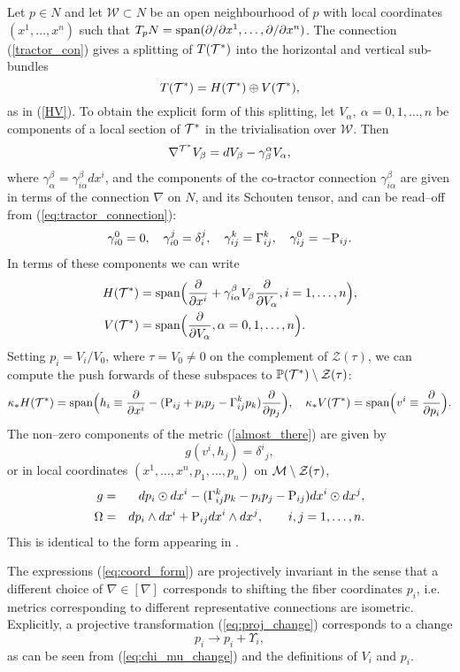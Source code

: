 Let $p\in N$ and let ${\mathcal W}\subset N$ be an open 
neighbourhood of $p$ with 
local coordinates $(x^1, \dots, x^n)$ such that
$T_pN=\mbox{span}(\partial/\partial x^1, \dots, \partial/\partial x^n)$. The connection 
(\ref{tractor_con}) gives a splitting of $T(\mathcal{T}^*)$ into the horizontal and
vertical sub-bundles
\[
T(\mathcal{T}^*)=H(\mathcal{T}^*)\oplus V(\mathcal{T}^*),
\]
as in (\ref{HV}).
To obtain the explicit form of this splitting, let $V_\alpha,\ \alpha=0, 1, \dots, n$ be components of a local section of $\mathcal{T}^*$ in the trivialisation over ${\mathcal{W}}$.
Then
\[
\nabla^{\mathcal{T}^*} V_\beta=d V_\beta-\gamma_{\beta}^{\alpha} V_\alpha,
\]
where $\gamma_{\alpha}^\beta= \gamma_{i\alpha}^\beta dx^i$, and the components
of the co-tractor connection 
$\gamma_{i\alpha}^\beta$  are given in terms of the connection
$\nabla$ on $N$, and its Schouten tensor, and 
can be read--off from (\ref{eq:tractor_connection}):
\[
\gamma_{i0}^0=0, \quad \gamma_{i0}^j=\delta_i^j,\quad
\gamma_{ij}^k=\Gamma_{ij}^k, \quad \gamma_{ij}^0=-\mathrm{P}_{ij}.
\]
In terms of these components we can write
\begin{align*}
H(\mathcal{T}^*)&=\mbox{span}
\Big( \frac{\partial}{\partial x^i}+ {\gamma_{i\alpha}^\beta} V_\beta
\frac{\partial}{\partial V_{\alpha}}, i=1, \dots, n \Big), \\
 V(\mathcal{T}^*)&=\mbox{span}\Big(\frac{\partial}{\partial V_{\alpha}}, \alpha=0, 1, 
\dots, n\Big).
\end{align*}
Setting $p_i=V_i/V_0$, where $\tau=V_0\neq 0$ %
on the complement of 
$\mathcal{Z}(\tau)$, 
  we can compute the push forwards
of these subspaces to $\mathbb{P}(\mathcal{T}^*)\setminus {\mathcal{Z}(\tau)}$:
\[
\kappa_* H(\mathcal{T}^*)=\mbox{span}\Big(h_i\equiv
\frac{\partial}{\partial x^i}-
(\mathrm{P}_{ij}+p_ip_j  -\Gamma_{ij}^kp_k)\frac{\partial}{\partial p_j}
\Big), \quad \kappa_* V(\mathcal{T}^*)=\mbox{span}\Big(v^i\equiv\frac{\partial}{\partial p_i}
\Big).
\]
The non--zero components of the  metric (\ref{almost_there}) are given by
\[
g(v^i, h_j)={\delta^i}_j,
\]
or in local coordinates $(x^1,\dots,x^n,p_1,\dots,p_n)$ on $\mathcal{M}\setminus {\mathcal{Z}(\tau)}$,
\begin{eqnarray}
g & = &  dp_{i}\odot dx^{i}-(\Gamma_{ij}^{k}p_{k}-p_{i}p_{j}-\mathrm{P}_{ij}) dx^{i}\odot dx^{j},\label{eq:coord_form}\\
\Omega & = &  dp_{i}\wedge dx^{i}+\mathrm{P}_{ij} dx^{i}\wedge dx^{j},\qquad i,j=1,\dots ,n.\nonumber 
\end{eqnarray}
This is identical to the form appearing in \cite{DM}.
\koniec

\begin{rmk}
The expressions (\ref{eq:coord_form}) are projectively invariant in the sense that a different choice of $\nabla\in[\nabla]$ corresponds to shifting the fiber coordinates $p_{i}$, i.e. metrics corresponding to different representative connections are isometric. Explicitly, a projective transformation (\ref{eq:proj_change}) corresponds to a change \begin{equation}
p_{i}\longrightarrow p_{i}+\Upsilon_{i},\label{eq:p_change}
\end{equation}
as can be seen from (\ref{eq:chi_mu_change}) and the definitions of $V_i$ and $p_i$.
\end{rmk}

